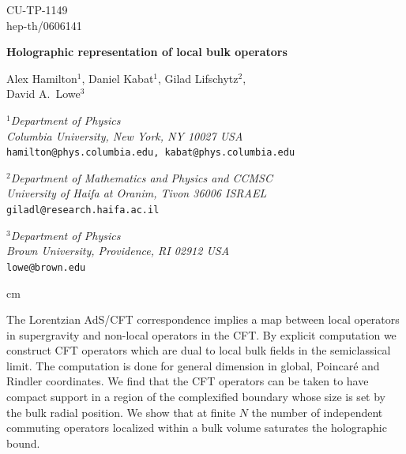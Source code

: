 \documentclass[12pt]{article}
\begin{document}
\begin{titlepage}
\begin{flushright}
{\small CU-TP-1149} \\
{\small hep-th/0606141}
\end{flushright}

\begin{center}

\vspace{2mm}

{\Large \bf Holographic representation of local bulk operators}

\vspace{3mm}

Alex Hamilton${}^1$, Daniel Kabat${}^1$, Gilad Lifschytz${}^2$, \\
David A.\ Lowe${}^3$ \\

\vspace{2mm}

${}^1${\small \sl Department of Physics} \\
{\small \sl Columbia University, New York, NY 10027 USA} \\
{\small \tt hamilton@phys.columbia.edu, kabat@phys.columbia.edu}
\vspace{1mm}

${}^2${\small \sl Department of Mathematics and Physics and CCMSC} \\
{\small \sl University of Haifa at Oranim, Tivon 36006 ISRAEL} \\
{\small \tt giladl@research.haifa.ac.il}
\vspace{1mm}

${}^3${\small \sl Department of Physics} \\
{\small \sl Brown University, Providence, RI 02912 USA} \\
{\small \tt lowe@brown.edu}

\end{center}

 cm

\noindent
The Lorentzian AdS/CFT correspondence implies a map between local
operators in supergravity and non-local operators in the CFT.  By
explicit computation we construct CFT operators which are dual to
local bulk fields in the semiclassical limit.  The computation is done
for general dimension in global, Poincar\'e and Rindler coordinates.
We find that the CFT operators can be taken to have compact support in
a region of the complexified boundary whose size is set by the bulk
radial position.  We show that at finite $N$ the number of independent
commuting operators localized within a bulk volume saturates the
holographic bound.

\end{titlepage}
\end{document}
